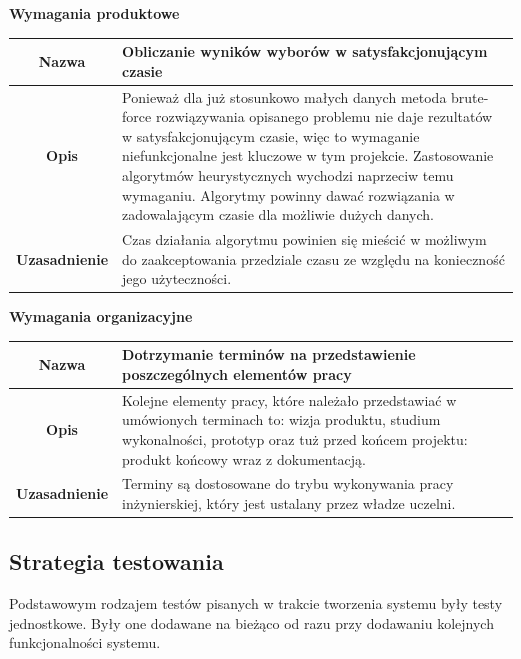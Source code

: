 \documentclass[polish,11pt]{aghthesis}
\begin{document}
\begin{center}
\textbf{Wymagania produktowe}
\end{center}

\begin{center}

\begin{tabular}{|c|p{10cm}|}
\hline
\textbf{Nazwa} & Obliczanie wyników wyborów w satysfakcjonującym czasie \\ 
\hline 
\textbf{Opis} & Ponieważ dla już stosunkowo małych danych metoda brute-force
rozwiązywania opisanego problemu nie daje rezultatów w
satysfakcjonującym czasie, więc to wymaganie niefunkcjonalne jest
kluczowe w tym projekcie. Zastosowanie algorytmów heurystycznych
wychodzi naprzeciw temu wymaganiu. Algorytmy powinny dawać
rozwiązania w zadowalającym czasie dla możliwie dużych danych. \\ 
\hline 
\textbf{Uzasadnienie} & Czas działania algorytmu powinien się mieścić w możliwym do
zaakceptowania przedziale czasu ze względu na konieczność jego
użyteczności.\\ 
\hline 
\end{tabular}
\end{center}

\begin{center}
\textbf{Wymagania organizacyjne}
\end{center}

\begin{center}
\begin{tabular}{|c|p{10cm}|}
\hline
\textbf{Nazwa} & Dotrzymanie terminów na przedstawienie poszczególnych elementów
pracy \\ 
\hline 
\textbf{Opis} & Kolejne elementy pracy, które należało przedstawiać w umówionych
terminach to: wizja produktu, studium wykonalności, prototyp oraz tuż
przed końcem projektu: produkt końcowy wraz z dokumentacją. \\ 
\hline 
\textbf{Uzasadnienie} & Terminy są dostosowane do trybu wykonywania pracy inżynierskiej,
który jest ustalany przez władze uczelni.\\ 
\hline 
\end{tabular}
\end{center}

\subsection{Strategia testowania}
Podstawowym rodzajem testów pisanych w trakcie tworzenia systemu były testy
jednostkowe. Były one dodawane na bieżąco od razu przy dodawaniu kolejnych
funkcjonalności systemu. 
\end{document}
